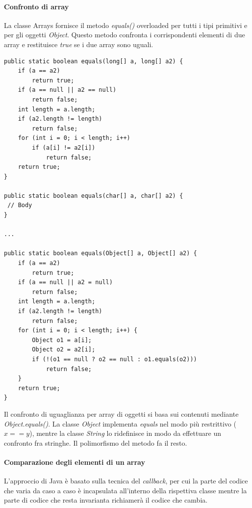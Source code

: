 \documentclass[12pt]{report}
\begin{document}
\paragraph{Confronto di array} La classe Arrays fornisce il metodo \textit{equals()} overloaded per tutti i tipi primitivi e per gli oggetti \textit{Object}. Questo metodo confronta i corrispondenti elementi di due array e restituisce \textit{true} se i due array sono uguali.
\begin{lstlisting}[style=javastyle]
public static boolean equals(long[] a, long[] a2) {
	if (a == a2)
		return true;
	if (a == null || a2 == null)
		return false;
	int length = a.length;
	if (a2.length != length)
		return false;
	for (int i = 0; i < length; i++)
		if (a[i] != a2[i])
			return false;
	return true;
}

public static boolean equals(char[] a, char[] a2) {
 // Body
}

...

public static boolean equals(Object[] a, Object[] a2) {
	if (a == a2)
		return true;
	if (a == null || a2 = null)
		return false;
	int length = a.length;
	if (a2.length != length)
		return false;
	for (int i = 0; i < length; i++) {
		Object o1 = a[i];
		Object o2 = a2[i];
		if (!(o1 == null ? o2 == null : o1.equals(o2)))
			return false;
	}
	return true;
}
\end{lstlisting}
Il confronto di uguaglianza per array di oggetti si basa sui contenuti mediante \textit{Object.equals()}. La classe \textit{Object} implementa \textit{equals} nel modo più restrittivo ($x == y$), mentre la classe \textit{String} lo ridefinisce in modo da effettuare un confronto fra stringhe. Il polimorfismo del metodo fa il resto.
\paragraph{Comparazione degli elementi di un array}
L'approccio di Java è basato sulla tecnica del \textit{callback}, per cui la parte del codice che varia da caso a caso è incapsulata all'interno della rispettiva classe mentre la parte di codice che resta invarianta richiamerà il codice che cambia.
\end{document}
